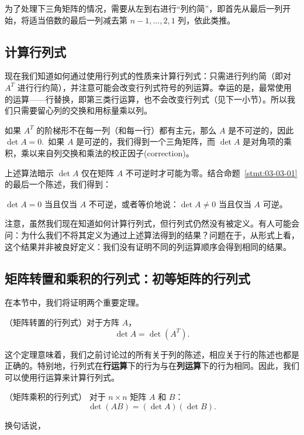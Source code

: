 为了处理下三角矩阵的情况，需要从左到右进行“列约简”，即首先从最后一列开始，将适当倍数的最后一列减去第 $n-1, \dots, 2, 1$ 列，依此类推。

\subsection{计算行列式}\label{sec:03-03-04}

现在我们知道如何通过使用行列式的性质来计算行列式：只需进行列约简（即对 $A^T$ 进行行约简），并注意可能会改变行列式符号的列运算。幸运的是，最常使用的运算——行替换，即第三类行运算，也不会改变行列式（见下一小节）。所以我们只需要留心列的交换和用标量乘以列。

如果 $A^T$ 的阶梯形不在每一列（和每一行）都有主元，那么 $A$ 是不可逆的，因此 $\det A = 0$.~如果 $A$ 是可逆的，我们得到一个三角矩阵，而 $\det A$ 是对角项的乘积，乘以来自列交换和乘法的校正因子(correction)。

上述算法暗示 $\det A$ 仅在矩阵 $A$ 不可逆时才可能为零。结合命题~\ref{stmt:03-03-01} 的最后一个陈述，我们得到：

\begin{proposition}\label{stmt:03-03-03}
$\det A = 0$ 当且仅当 $A$ 不可逆，或者等价地说：$\det A \neq 0$ 当且仅当 $A$ 可逆。
\end{proposition}

注意，虽然我们现在知道如何计算行列式，但行列式仍然没有被定义。有人可能会问：为什么我们不将其定义为通过上述算法得到的结果？问题在于，从形式上看，这个结果并非被良好定义：我们没有证明不同的列运算顺序会得到相同的结果。

\subsection{矩阵转置和乘积的行列式：初等矩阵的行列式}\label{sec:03-03-05}

在本节中，我们将证明两个重要定理。

\begin{theorem}\label{stmt:03-03-04} （矩阵转置的行列式）对于方阵 $A$，$$\det A = \det(A^T).$$\end{theorem}

这个定理意味着，我们之前讨论过的所有关于列的陈述，相应关于行的陈述也都是正确的。特别地，行列式在\textbf{行运算}下的行为与在\textbf{列运算}下的行为相同。因此，我们可以使用行运算来计算行列式。

\begin{theorem}\label{stmt:03-03-05} （矩阵乘积的行列式） 对于 $n \times n$ 矩阵 $A$ 和 $B$：
$$
\det(AB) = (\det A)(\det B).$$
\end{theorem}
换句话说，

